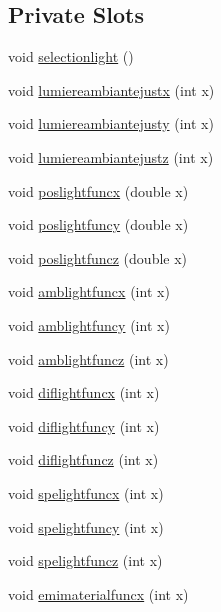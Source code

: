 \subsection*{Private Slots}
\begin{DoxyCompactItemize}
\item 
void \hyperlink{class_mondock_a25391f1fac7a8a46e761f2f8c9c2fdc8}{selectionlight} ()
\item 
void \hyperlink{class_mondock_a1cdbe11296a3fe24d88992bf7d2236f4}{lumiereambiantejustx} (int x)
\item 
void \hyperlink{class_mondock_ae989829f726237ddcacbe9b1ae79ab62}{lumiereambiantejusty} (int x)
\item 
void \hyperlink{class_mondock_a824b5c728f21b3ef7d47d322cd0a07ee}{lumiereambiantejustz} (int x)
\item 
void \hyperlink{class_mondock_a05ec25870c70f2eeba2ccdc1da44e7ca}{poslightfuncx} (double x)
\item 
void \hyperlink{class_mondock_ae8593b3cbc4c42badf600599a2e01dce}{poslightfuncy} (double x)
\item 
void \hyperlink{class_mondock_aa5ec8a8453515216ffd85961c868108f}{poslightfuncz} (double x)
\item 
void \hyperlink{class_mondock_a07685bc7db5c3346c1813e84abf8aa2f}{amblightfuncx} (int x)
\item 
void \hyperlink{class_mondock_a2397e94ee9af0a37c12b1443d70c17b6}{amblightfuncy} (int x)
\item 
void \hyperlink{class_mondock_a727e012b9b0df615ea2d585f98b00fb9}{amblightfuncz} (int x)
\item 
void \hyperlink{class_mondock_ad475a793b9d77352f2e844b22315612e}{diflightfuncx} (int x)
\item 
void \hyperlink{class_mondock_a5e60c8e141570f171d420de6f6e9af54}{diflightfuncy} (int x)
\item 
void \hyperlink{class_mondock_a4fd34f4035885b71a4d914ff85496715}{diflightfuncz} (int x)
\item 
void \hyperlink{class_mondock_ad12c449ba7b08f8430353e5fb7687e6a}{spelightfuncx} (int x)
\item 
void \hyperlink{class_mondock_ac2c735aede2c4c621f08f9c34d6a4c9c}{spelightfuncy} (int x)
\item 
void \hyperlink{class_mondock_ad626e2142ce5065af9a3bd891c825a5a}{spelightfuncz} (int x)
\item 
void \hyperlink{class_mondock_a8eefc5e5056a10e66d69e3d8cfb21941}{emimaterialfuncx} (int x)
\item 

\end{DoxyCompactItemize}
